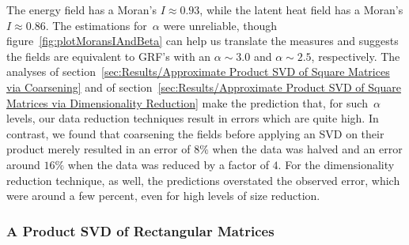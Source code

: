 \documentclass[ijgi,article,submit,moreauthors,pdftex,10pt,a4paper]{Definitions/mdpi}
\begin{document}
The energy field has a Moran's $I \approx 0.93$, while the latent heat field has a Moran's $I \approx 0.86$. The estimations for~$\alpha$ were unreliable, though figure~\ref{fig:plotMoransIAndBeta} can help us translate the measures and suggests the fields are equivalent to GRF's with an $\alpha \sim 3.0$ and $\alpha \sim 2.5$, respectively. The analyses of section~\ref{sec:Results/Approximate Product SVD of Square Matrices via Coarsening} and of section~\ref{sec:Results/Approximate Product SVD of Square Matrices via Dimensionality Reduction} make the prediction that, for such~$\alpha$ levels, our data reduction techniques result in errors which are quite high. In contrast, we found that coarsening the fields before applying an SVD on their product merely resulted in an error of $8\%$ when the data was halved and an error around $16\%$ when the data was reduced by a factor of $4$. For the dimensionality reduction technique, as well, the predictions overstated the observed error, which were around a few percent, even for high levels of size reduction.

\subsubsection{A Product SVD of Rectangular Matrices}
\label{sec:Results/Case Study of a Product SVD of Rectangular Matrices}
\end{document}
